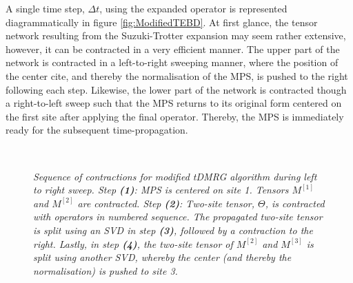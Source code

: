 A single time step, $\Delta t$, using the expanded operator is represented diagrammatically in figure \ref{fig:ModifiedTEBD}. At first glance, the tensor network resulting from the Suzuki-Trotter expansion may seem rather extensive, however, it can be contracted in a very efficient manner. The upper part of the network is contracted in a left-to-right sweeping manner, where the position of the center cite, and thereby the normalisation of the MPS, is pushed to the right following each step. Likewise, the lower part of the network is contracted though a right-to-left sweep such that the MPS returns to its original form centered on the first site after applying the final operator. Thereby, the MPS is immediately ready for the subsequent time-propagation.\\
\begin{figure}[h!]
\centering %
\begin{subfigure}[b]{0.4\textwidth}
	\caption{}  
  	
\end{subfigure}
\hspace{10mm}
\begin{subfigure}[b]{0.4\textwidth}
	\caption{}    
  	
\end{subfigure}
\\ %
\vspace{5mm}
\begin{subfigure}[b]{0.4\textwidth}
	\caption{}    	
  	
\end{subfigure}
\hspace{10mm}
\begin{subfigure}[b]{0.4\textwidth}
	\caption{}  
  	
\end{subfigure}
\caption{\textit{Sequence of contractions for modified tDMRG algorithm during left to right sweep. Step \textbf{(1)}: MPS is centered on site 1. Tensors $M^{[1]}$ and $M^{[2]}$ are contracted. Step \textbf{(2)}: Two-site tensor, $\Theta$, is contracted with operators in numbered sequence. The propagated two-site tensor is split using an SVD in step \textbf{(3)}, followed by a contraction to the right. Lastly, in step \textbf{(4)}, the two-site tensor of $M^{[2]}$ and $M^{[3]}$ is split using another SVD, whereby the center (and thereby the normalisation) is pushed to site 3.}}
\label{fig:TEBDContraction}
\end{figure}
